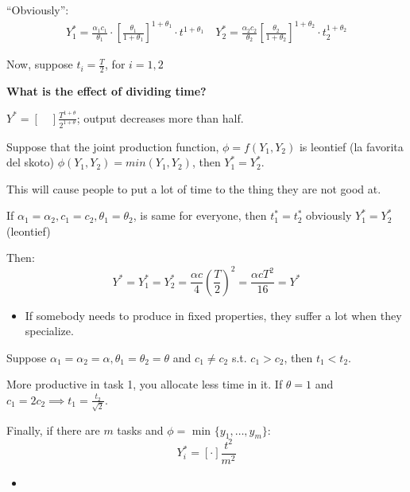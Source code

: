 \documentclass[14pt,notitlepage]{article}
\begin{document}
``Obviously'':
\begin{align*}
Y^*_1 = \frac{\alpha_1 c_1}{\theta_1} \cdot [\frac{\theta_1}{1+\theta_1}]^{1+\theta_1} \cdot {t^{1+\theta_1}} \quad Y^*_2 = \frac{\alpha_2 c_2}{\theta_2} [\frac{\theta_2}{1+\theta_2}]^{1+\theta_2} \cdot t^{1+\theta_2}_2
\end{align*}

Now, suppose $t_i = \frac{T}{2}$, for $i = 1,2$

\textbf{What is the effect of dividing time?}

$Y^* = [ \quad ] \frac{T^{1+\theta}}{2^{1+\theta}}$; output decreases more than half.

Suppose that the joint production function, $\phi = f(Y_1,Y_2)$ is leontief (la favorita del skoto) $\phi(Y_1,Y_2) = min (Y_1,Y_2)$, then $Y^*_1 = Y^*_2$.

This will cause people to put a lot of time to the thing they are not good at.

If $\alpha_1 = \alpha_2, c_1 = c_2, \theta_1 = \theta_2$, is same for everyone, then $t^*_1 = t^*_2$ obviously $Y^*_1 = Y^*_2$ (leontief)

Then:
\begin{equation*}
Y^* = Y^*_1 = Y^*_2 = \frac{\alpha c}{4}(\frac{T}{2})^2 = \boxed{\frac{\alpha c T^2}{16} = Y^*}
\end{equation*}

\begin{itemize}
\item If somebody needs to produce in fixed properties, they suffer a lot when they specialize.
\end{itemize}

Suppose $\alpha_1 = \alpha_2 = \alpha, \theta_1 = \theta_2 = \theta$ and $c_1 \neq c_2$ s.t. $c_1 > c_2$, then
$t_1 < t_2$.

More productive in task 1, you allocate less time in it. If $\theta = 1$ and $c_1 = 2c_2 \implies t_1 = \frac{t_2}{\sqrt{2}}$.

Finally, if there are $m$ tasks and $\phi =$ min $\{y_1,\dots,y_m\}$:
\begin{equation*}
\boxed{Y^*_i = [\cdot] \frac{t^2}{m^2}}
\end{equation*}

\begin{itemize}
\item {}
\end{itemize}
\end{document}
